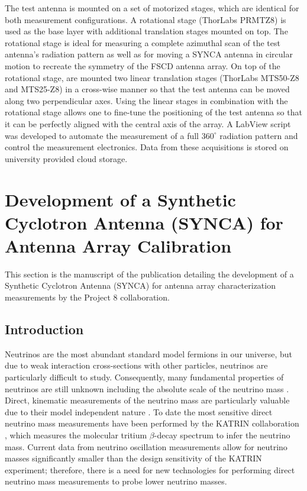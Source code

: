 The test antenna is mounted on a set of motorized stages, which are identical for both measurement configurations. A rotational stage (ThorLabs PRMTZ8) is used as the base layer with additional translation stages mounted on top. The rotational stage is ideal for measuring a complete azimuthal scan of the test antenna's radiation pattern as well as for moving a SYNCA antenna in circular motion to recreate the symmetry of the FSCD antenna array. On top of the rotational stage, are mounted two linear translation stages (ThorLabs MTS50-Z8 and MTS25-Z8) in a cross-wise manner so that the test antenna can be moved along two perpendicular axes. Using the linear stages in combination with the rotational stage allows one to fine-tune the positioning of the test antenna so that it can be perfectly aligned with the central axis of the array. A LabView script was developed to automate the measurement of a full $360^\circ$ radiation pattern and control the measurement electronics. Data from these acquisitions is stored on university provided cloud storage.

\section{Development of a Synthetic Cyclotron Antenna (SYNCA) for Antenna Array Calibration}
\label{sec:SYNCA}
This section is the manuscript of the publication \cite{p8synca} detailing the development of a Synthetic Cyclotron Antenna (SYNCA) for antenna array characterization measurements by the Project 8 collaboration. 

\subsection{Introduction}
\label{sec:intro}

Neutrinos are the most abundant standard model fermions in our universe, but due to weak interaction cross-sections with other particles, neutrinos are particularly difficult to study. Consequently, many fundamental properties of neutrinos are still unknown including the absolute scale of the neutrino mass \cite{Workman:2022ynf}. Direct, kinematic measurements of the neutrino mass are particularly valuable due to their model independent nature \cite{FORMAGGIO20211}. To date the most sensitive direct neutrino mass measurements have been performed by the KATRIN collaboration \cite{Aker2022}, which measures the molecular tritium $\beta$-decay spectrum to infer the neutrino mass. Current data from neutrino oscillation measurements \cite{Workman:2022ynf} allow for neutrino masses significantly smaller than the design sensitivity of the KATRIN experiment; therefore, there is a need for new technologies for performing direct neutrino mass measurements to probe lower neutrino masses.

